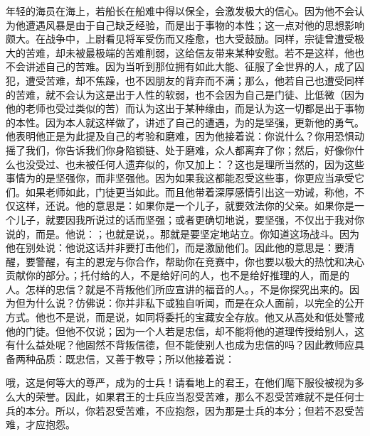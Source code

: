 年轻的海员在海上，若船长在船难中得以保全，会激发极大的信心。因为他不会认为他遭遇风暴是由于自己缺乏经验，而是出于事物的本性；这一点对他的思想影响颇大。在战争中，上尉看见将军受伤而又痊愈，也大受鼓励。同样，宗徒曾遭受极大的苦难，却未被最极端的苦难削弱，这给信友带来某种安慰。若不是这样，他也不会讲述自己的苦难。因为当听到那位拥有如此大能、征服了全世界的人，成了囚犯，遭受苦难，却不焦躁，也不因朋友的背弃而不满；那么，他若自己也遭受同样的苦难，就不会认为这是出于人性的软弱，也不会因为自己是门徒、比低微（因为他的老师也受过类似的苦）而认为这出于某种缘由，而是认为这一切都是出于事物的本性。因为本人就这样做了，讲述了自己的遭遇，为的是坚强，更新他的勇气。他表明他正是为此提及自己的考验和磨难，因为他接着说：你说什么？你用恐惧动摇了我们，你告诉我们你身陷锁链、处于磨难，众人都离弃了你；然后，好像你什么也没受过、也未被任何人遗弃似的，你又加上：？这也是理所当然的，因为这些事情为的是坚强你，而非坚强他。因为如果我这都能忍受这些事，你更应当承受它们。如果老师如此，门徒更当如此。而且他带着深厚感情引出这一劝诫，称他，不仅这样，还说。他的意思是：如果你是一个儿子，就要效法你的父亲。如果你是一个儿子，就要因我所说过的话而坚强；或者更确切地说，要坚强，不仅出于我对你说的，而是。他说：；也就是说，。那就是要坚定地站立。你知道这场战斗。因为他在别处说：他说这话并非要打击他们，而是激励他们。因此他的意思是：要清醒，要警醒，有主的恩宠与你合作，帮助你在竞赛中，你也要以极大的热忱和决心贡献你的部分。；托付给的人，不是给好问的人，也不是给好推理的人，而是的人。怎样的忠信？就是不背叛他们所应宣讲的福音的人。，不是你探究出来的。因为但为什么说？仿佛说：你并非私下或独自听闻，而是在众人面前，以完全的公开方式。他也不是说，而是说，如同将委托的宝藏安全存放。他又从高处和低处警戒他的门徒。但他不仅说；因为一个人若是忠信，却不能将他的道理传授给别人，这有什么益处呢？他固然不背叛信德，但不能使别人也成为忠信的吗？因此教师应具备两种品质：既忠信，又善于教导；所以他接着说：\par

哦，这是何等大的尊严，成为的士兵！请看地上的君王，在他们麾下服役被视为多么大的荣誉。因此，如果君王的士兵应当忍受苦难，那么不忍受苦难就不是任何士兵的本分。所以，你若忍受苦难，不应抱怨，因为那是士兵的本分；但若不忍受苦难，才应抱怨。\par

